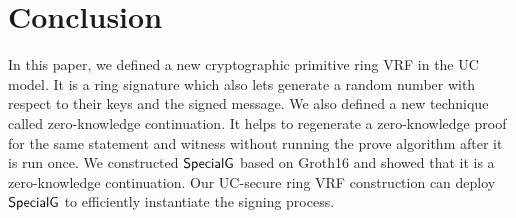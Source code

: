 \section{Conclusion}
In this paper, we defined a new cryptographic primitive ring VRF in the UC model. It is a ring signature which also lets generate a random number with respect to their keys and the signed message. We also defined a new technique called zero-knowledge continuation. It helps to regenerate a zero-knowledge proof for the same statement and witness without running the prove algorithm after it is run once. We constructed $ {\mathsf{SpecialG}} $ based on Groth16 \cite{Groth16} and showed that it is a zero-knowledge continuation. Our UC-secure ring VRF construction can deploy $ {\mathsf{SpecialG}} $ to efficiently instantiate the signing process.